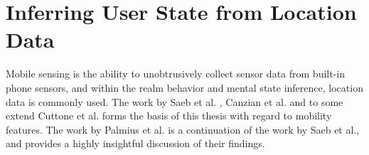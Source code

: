 \section{Inferring User State from Location Data}





Mobile sensing is the ability to unobtrusively collect sensor data from built-in phone sensors, and within the realm behavior and mental state inference, location data is commonly used. The work by Saeb et al. \cite{Saeb2015}, Canzian et al. \cite{Canzian2015}  and to some extend Cuttone et al. \cite{sparse-location-2014} forms the basis of this thesis with regard to mobility features. The work by Palmius et al. \cite{palmius2017} is a continuation of the work by Saeb et al., and provides a highly insightful discussion of their findings.\\


